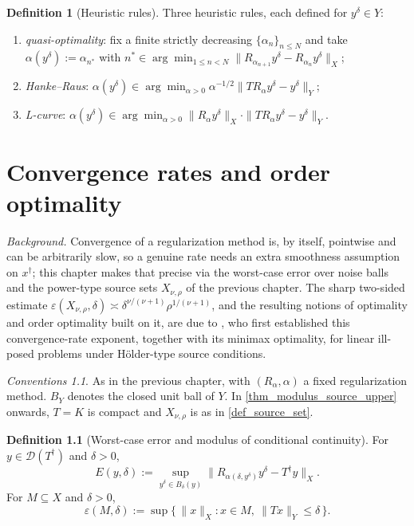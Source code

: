 \documentclass[a4paper]{report}
\theoremstyle{plain}
\theoremstyle{definition}
\newtheorem{definition}[theorem]{Definition}
\theoremstyle{remark}
\newtheorem{assumptions}[theorem]{Conventions}
\newcommand{\Dom}{\mathcal{D}}
\newcommand{\dg}{^{\dagger}}
\begin{document}
\begin{definition}[Heuristic rules]
  \label{def_heuristic_rules}
  Three heuristic rules, each defined for $y^{\delta} \in Y$:
  \begin{enumerate}
    \item \emph{quasi-optimality}: fix a finite strictly decreasing
      $\{\alpha_n\}_{n \le N}$ and take $\alpha(y^{\delta}) := \alpha_{n^{*}}$ with
      $n^{*} \in \arg\min_{1 \le n < N} \|R_{\alpha_{n+1}}y^{\delta} -
      R_{\alpha_n}y^{\delta}\|_X$;
    \item \emph{Hanke--Raus}: $\alpha(y^{\delta}) \in \arg\min_{\alpha > 0}
      \alpha^{-1/2}\|TR_{\alpha}y^{\delta} - y^{\delta}\|_Y$;
    \item \emph{L-curve}: $\alpha(y^{\delta}) \in \arg\min_{\alpha > 0}
      \|R_{\alpha}y^{\delta}\|_X \cdot \|TR_{\alpha}y^{\delta} - y^{\delta}\|_Y$.
  \end{enumerate}
\end{definition}


\chapter{Convergence rates and order optimality}
\label{ch_14_order_optimality}

\noindent\emph{Background.} Convergence of a regularization method is, by itself, pointwise
and can be arbitrarily slow, so a genuine rate needs an extra smoothness assumption on
$x\dg$; this chapter makes that precise via the worst-case error over noise balls and the
power-type source sets $X_{\nu,\rho}$ of the previous chapter. The sharp two-sided estimate
$\varepsilon(X_{\nu,\rho},\delta) \asymp \delta^{\nu/(\nu+1)}\rho^{1/(\nu+1)}$, and the
resulting notions of optimality and order optimality built on it, are due to
\citet{Natterer1984}, who first established this convergence-rate exponent, together with
its minimax optimality, for linear ill-posed problems under Hölder-type source
conditions.

\begin{assumptions}
  \label{asm_convergence_rates_order}
  As in the previous chapter, with $(R_{\alpha},
\alpha)$ a fixed regularization method.  $B_Y$ denotes the closed unit ball of $Y$.  In
\cref{thm_modulus_source_upper} onwards, $T = K$ is compact and $X_{\nu,\rho}$ is as in
\cref{def_source_set}.
\end{assumptions}

\begin{definition}[Worst-case error and modulus of conditional continuity]
  \label{def_worst_case_error}
  For $y \in \Dom(T\dg)$ and $\delta > 0$,
  \[
    E(y,\delta) := \sup_{y^{\delta} \in B_{\delta}(y)}
      \bigl\| R_{\alpha(\delta,y^{\delta})} y^{\delta} - T\dg y \bigr\|_X .
  \]
  For $M \subseteq X$ and $\delta > 0$,
  \[
    \varepsilon(M,\delta) := \sup\{\, \|x\|_X : x \in M,\ \|Tx\|_Y \le \delta \,\} .
  \]
\end{definition}
\end{document}
